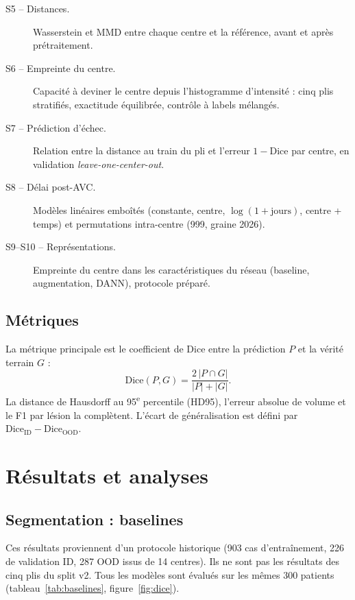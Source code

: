\documentclass[11pt,a4paper]{report}
\begin{document}
\begin{description}
  \item[S5 -- Distances.] Wasserstein et MMD entre chaque centre et la
        référence, avant et après prétraitement.
  \item[S6 -- Empreinte du centre.] Capacité à deviner le centre depuis
        l'histogramme d'intensité : cinq plis stratifiés, exactitude
        équilibrée, contrôle à labels mélangés.
  \item[S7 -- Prédiction d'échec.] Relation entre la distance au train du
        pli et l'erreur $1 - \text{Dice}$ par centre, en validation
        \emph{leave-one-center-out}.
  \item[S8 -- Délai post-AVC.] Modèles linéaires emboîtés (constante,
        centre, $\log(1 + \text{jours})$, centre + temps) et permutations
        intra-centre (999, graine 2026).
  \item[S9--S10 -- Représentations.] Empreinte du centre dans les
        caractéristiques du réseau (baseline, augmentation, DANN), protocole
        préparé.
\end{description}

\section{Métriques}

La métrique principale est le coefficient de Dice entre la prédiction $P$ et
la vérité terrain $G$ :
\begin{equation}
  \text{Dice}(P, G) = \frac{2\,|P \cap G|}{|P| + |G|}.
\end{equation}
La distance de Hausdorff au 95\textsuperscript{e} percentile (HD95), l'erreur
absolue de volume et le F1 par lésion la complètent. L'écart de
généralisation est défini par $\text{Dice}_{\text{ID}} -
\text{Dice}_{\text{OOD}}$.

\chapter{Résultats et analyses}
\label{chap:resultats}

\section{Segmentation : baselines}

Ces résultats proviennent d'un protocole historique (903 cas
d'entraînement, 226 de validation ID, 287 OOD issus de 14 centres). Ils ne
sont pas les résultats des cinq plis du split v2. Tous les modèles sont
évalués sur les mêmes 300 patients (tableau~\ref{tab:baselines},
figure~\ref{fig:dice}).
\end{document}
